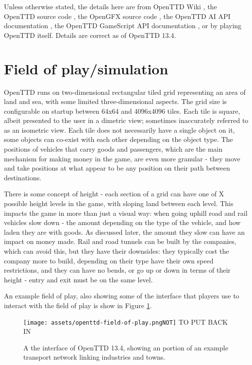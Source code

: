 \documentclass[logo,msc,dsti]{infthesis}    %
\begin{document}
Unless otherwise stated, the details here are from OpenTTD Wiki \cite{OpenTTDWiki}, the OpenTTD source code \cite{OpenTTDSource}, the OpenGFX source code \cite{OpenGFXSource}, the OpenTTD AI API documentation \cite{OpenTTDAIAPIDocs}, the OpenTTD GameScript API documentation \cite{OpenTTDGSAPIDocs}, or by playing OpenTTD itself. Details are correct as of OpenTTD 13.4.

\section{Field of play/simulation}

OpenTTD runs on two-dimensional rectangular tiled grid representing an area of land and sea, with some limited three-dimensional aspects. The grid size is configurable on startup between 64x64 and 4096x4096 tiles. Each tile is square, albeit presented to the user in a dimetric view; sometimes inaccurately referred to as an isometric view. Each tile does not necessarily have a single object on it, some objects can co-exist with each other depending on the object type. The positions of vehicles that carry goods and passengers, which are the main mechanism for making money in the game, are even more granular - they move and take positions at what appear to be any position on their path between destinations.

There is some concept of height - each section of a grid can have one of X possible height levels in the game, with sloping land between each level. This impacts the game in more than just a visual way: when going uphill road and rail vehicles slow down - the amount depending on the type of the vehicle, and how laden they are with goods. As discussed later, the amount they slow can have an impact on money made. Rail and road tunnels can be built by the companies, which can avoid this, but they have their downsides: they typically cost the company more to build, depending on their type have their own speed restrictions, and they can have no bends, or go up or down in terms of their height - entry and exit must be on the same level.

An example field of play, also showing some of the interface that players use to interact with the field of play is show in Figure \ref{figure:openttd-field-of-play}.

\begin{figure}[h]
\centering
\texttt{[image: assets/openttd-field-of-play.pngNOT]}
TO PUT BACK IN
\caption{A the interface of OpenTTD 13.4, showing an portion of an example transport network linking industries and towns.}
\label{figure:openttd-field-of-play}
\end{figure}
\end{document}
